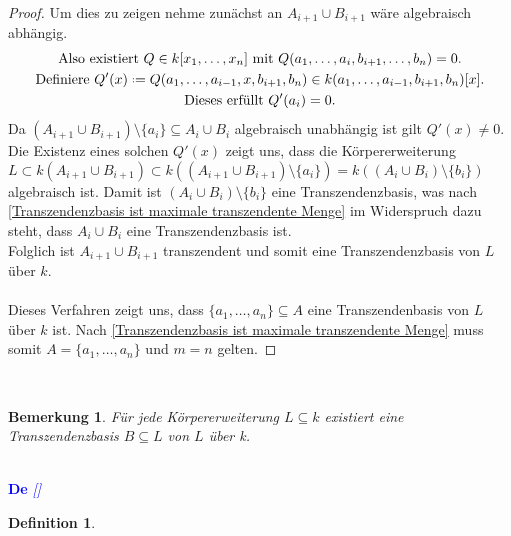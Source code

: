 \documentclass[10pt,a4paper]{report}
\newcounter{Aussage}[chapter]
\newtheorem{bem}[Aussage]{Bemerkung}
\newtheorem{definition}[Aussage]{Definition}
\newcommand*{\defeq}{\mathrel{\vcenter{\baselineskip0.5ex \lineskiplimit0pt
                     \hbox{\scriptsize.}\hbox{\scriptsize.}}}%
                     =}
\begin{document}
\begin{proof}
Um dies zu zeigen nehme zunächst an $A_{i+1} \cup B_{i+1}$ wäre algebraisch abhängig.
\begin{gather*}
\text{Also existiert } Q \in k[x_1, \dots ,x_n] \text{ mit } Q(a_1, \dots ,a_i,b_{i+1},\dots,b_n) = 0. \\
\text{Definiere } Q'(x) \defeq Q(a_1,\dots,a_{i-1},x,b_{i+1},b_n) \in k(a_1,\dots,a_{i-1},b_{i+1},b_n)[x]. \\
\text{Dieses erfüllt } Q'(a_i) = 0.
\end{gather*}
Da $(A_{i+1} \cup B_{i+1}) \setminus \lbrace a_i \rbrace \subseteq A_i \cup B_i$ algebraisch unabhängig ist gilt $Q'(x) \neq 0$.\\
Die Existenz eines solchen $Q'(x)$ zeigt uns, dass die Körpererweiterung \\$L \subset k(A_{i+1} \cup B_{i+1}) \subset k((A_{i+1} \cup B_{i+1})\setminus\lbrace a_i \rbrace) = k((A_i \cup B_i)\setminus\lbrace b_i \rbrace)$ algebraisch ist. Damit ist $(A_i\cup B_i)\setminus\lbrace b_i \rbrace$ eine Transzendenzbasis, was nach \cref{Transzendenzbasis ist maximale transzendente Menge} im Widerspruch dazu steht, dass $A_i \cup B_i$ eine Transzendenzbasis ist.\\
Folglich ist $A_{i+1} \cup B_{i+1}$ transzendent und somit eine Transzendenzbasis von $L$ über $k$.\ \\
\ \\
Dieses Verfahren zeigt uns, dass $\lbrace a_1, \dots , a_n \rbrace \subseteq A$ eine Transzendenbasis von $L$ über $k$ ist. Nach \cref{Transzendenzbasis ist maximale transzendente Menge} muss somit $A = \lbrace a_1, \dots , a_n \rbrace$ und $m = n$ gelten.
\end{proof}
\ \\
\begin{bem}
Für jede Körpererweiterung $L \subseteq k$ existiert eine Transzendenzbasis $B \subseteq L$ von $L$ über k.
\end{bem}


\ \\
\textcolor{blue}{\textbf{De} \textit{[]}}
\begin{definition}\label{Definition Seperabel}

\end{definition}
\end{document}
